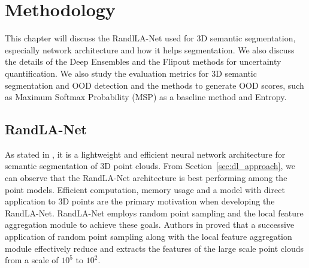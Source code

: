
\chapter{Methodology}
\label{chapter:methodology}
This chapter will discuss the RandlLA-Net used for 3D semantic segmentation, especially network architecture and how it helps segmentation. 
We also discuss the details of the Deep Ensembles and the Flipout methods for uncertainty quantification.
We also study the evaluation metrics for 3D semantic segmentation and OOD detection and the methods to generate OOD scores, such as Maximum Softmax Probability (MSP) as a baseline method and Entropy.
\section{RandLA-Net}
\label{sec:meth_randla}
As stated in \cite{Hu_2020_CVPR_Randla}, it is a lightweight and efficient neural network architecture for semantic segmentation of 3D point clouds.
From Section~\ref{sec:dl_approach}, we can observe that the RandLA-Net architecture is best performing among the point models.
Efficient computation, memory usage and a model with direct application to 3D points are the primary motivation when developing the RandLA-Net.
RandLA-Net employs random point sampling and the local feature aggregation module to achieve these goals.
Authors in \cite{Hu_2020_CVPR_Randla} proved that a successive application of random point sampling along with the local feature aggregation module effectively reduce and extracts the features of the large scale point clouds from a scale of $10^5$ to $10^2$.

